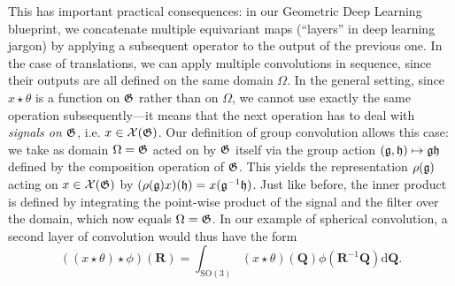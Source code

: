 This has important practical consequences: in our Geometric Deep Learning blueprint, we concatenate multiple equivariant maps (``layers'' in deep learning jargon) by applying a subsequent operator to the output of the previous one. 
%
In the case of translations, we can apply multiple convolutions in sequence, since their outputs are all defined on the same domain $\Omega$. 
%
In the general setting, since $x \star \theta$ is a function on ${\mathfrak{G}}$ rather than on $\Omega$, we cannot use exactly the same operation subsequently---it means that the next operation has to deal with {\em signals on ${\mathfrak{G}}$}, i.e. $x \in \mathcal{X}({\mathfrak{G}})$.  
%
Our definition of group convolution allows this case: 
we take as domain $\Omega = {\mathfrak{G}}$ acted on by ${\mathfrak{G}}$ itself via the group action $({\mathfrak{g}}, {\mathfrak{h}}) \mapsto {\mathfrak{g}} {\mathfrak{h}}$ defined by the composition operation of ${\mathfrak{G}}$.
This yields the representation $\rho({\mathfrak{g}})$ acting on $x \in \mathcal{X}({\mathfrak{G}})$  by $(\rho({\mathfrak{g}}) x)({\mathfrak{h}}) = x({\mathfrak{g}}^{-1}{\mathfrak{h}})$.
Just like before, the inner product is defined by integrating the %
point-wise product of the signal and the filter 
over the domain, which now equals  $\Omega = {\mathfrak{G}}$.
%
In our example of spherical convolution, a second layer of convolution would thus have the form
$$
((x\star \theta)\star \phi)(\mathbf{R}) = \int_{\mathrm{SO}(3)} (x\star \theta)(\textbf{Q}) \phi(\mathbf{R}^{-1}\mathbf{Q}) \mathrm{d}\mathbf{Q}.
$$







